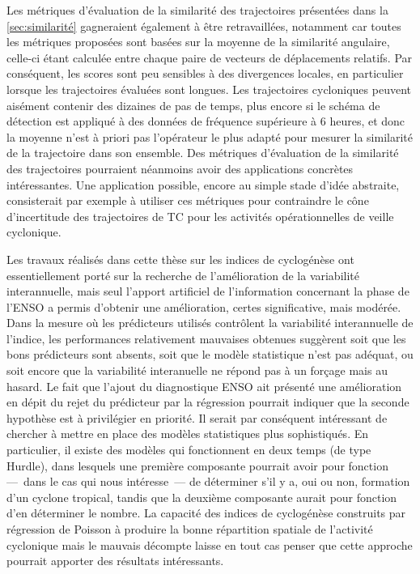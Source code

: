 \documentclass[../main.tex]{subfiles}
\begin{document}
Les métriques d'évaluation de la similarité des trajectoires présentées dans la \cref{sec:similarité} gagneraient également à être retravaillées, notamment car
toutes les métriques proposées sont basées sur la moyenne de la similarité angulaire, celle-ci étant calculée entre chaque paire de vecteurs de déplacements
relatifs. Par conséquent, les scores sont peu sensibles à des divergences locales, en particulier lorsque les trajectoires évaluées sont longues. Les
trajectoires cycloniques peuvent aisément contenir des dizaines de pas de temps, plus encore si le schéma de détection est appliqué à des données de
fréquence supérieure à \num{6} heures, et donc la moyenne n'est à priori pas l'opérateur le plus adapté pour mesurer la similarité de la trajectoire dans son
ensemble. Des métriques d'évaluation de la similarité des trajectoires pourraient néanmoins avoir des applications concrètes intéressantes. Une application
possible, encore au simple stade d'idée abstraite, consisterait par exemple à utiliser ces métriques pour contraindre le cône d'incertitude des trajectoires de
TC pour les activités opérationnelles de veille cyclonique.

Les travaux réalisés dans cette thèse sur les indices de cyclogénèse ont essentiellement porté sur la recherche de l'amélioration de la variabilité
interannuelle, mais seul l'apport artificiel de l'information concernant la phase de l'ENSO a permis d'obtenir une amélioration, certes significative, mais
modérée. Dans la mesure où les prédicteurs utilisés contrôlent la variabilité interannuelle de l'indice, les performances relativement mauvaises obtenues
suggèrent soit que les bons prédicteurs sont absents, soit que le modèle statistique n'est pas adéquat, ou soit encore que la variabilité interanuelle ne répond
pas à un forçage mais au hasard. Le fait que l'ajout du diagnostique ENSO ait présenté une amélioration en dépit du rejet du prédicteur par la régression
pourrait indiquer que la seconde hypothèse est à privilégier en priorité. Il serait par conséquent intéressant de chercher à mettre en place des modèles
statistiques plus sophistiqués. En particulier, il existe des modèles qui fonctionnent en deux temps (de type Hurdle), dans lesquels une première composante
pourrait avoir pour fonction ---~dans le cas qui nous intéresse~--- de déterminer s'il y a, oui ou non, formation d'un cyclone tropical, tandis que la deuxième
composante aurait pour fonction d'en déterminer le nombre. La capacité des indices de cyclogénèse construits par régression de Poisson à produire la bonne
répartition spatiale de l'activité cyclonique mais le mauvais décompte laisse en tout cas penser que cette approche pourrait apporter des résultats
intéressants.
\end{document}
